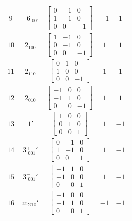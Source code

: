 \documentclass[fleqn,8pt]{jsarticle}
\begin{document}
\begin{longtable}{ccccc}
$ 9 $ & $ -6^{-}_{\,\,001} $ & $ \begin{bmatrix} 0 & -1 & 0 \\ 1 & -1 & 0 \\ 0 & 0 & -1 \end{bmatrix} $ & $ -1 $ & $ 1 $ \\ \hline
$ 10 $ & $ 2{}_{100} $ & $ \begin{bmatrix} 1 & -1 & 0 \\ 0 & -1 & 0 \\ 0 & 0 & -1 \end{bmatrix} $ & $ 1 $ & $ 1 $ \\ \hline
$ 11 $ & $ 2{}_{110} $ & $ \begin{bmatrix} 0 & 1 & 0 \\ 1 & 0 & 0 \\ 0 & 0 & -1 \end{bmatrix} $ & $ 1 $ & $ 1 $ \\ \hline
$ 12 $ & $ 2{}_{010} $ & $ \begin{bmatrix} -1 & 0 & 0 \\ -1 & 1 & 0 \\ 0 & 0 & -1 \end{bmatrix} $ & $ 1 $ & $ 1 $ \\ \hline
$ 13 $ & $ 1{}' $ & $ \begin{bmatrix} 1 & 0 & 0 \\ 0 & 1 & 0 \\ 0 & 0 & 1 \end{bmatrix} $ & $ 1 $ & $ -1 $ \\ \hline
$ 14 $ & $ 3^{+}_{\,\,001}{}' $ & $ \begin{bmatrix} 0 & -1 & 0 \\ 1 & -1 & 0 \\ 0 & 0 & 1 \end{bmatrix} $ & $ 1 $ & $ -1 $ \\ \hline
$ 15 $ & $ 3^{-}_{\,\,001}{}' $ & $ \begin{bmatrix} -1 & 1 & 0 \\ -1 & 0 & 0 \\ 0 & 0 & 1 \end{bmatrix} $ & $ 1 $ & $ -1 $ \\ \hline
$ 16 $ & $ {\rm m}_{210}{}' $ & $ \begin{bmatrix} -1 & 0 & 0 \\ -1 & 1 & 0 \\ 0 & 0 & 1 \end{bmatrix} $ & $ -1 $ & $ -1 $ \\ \hline

\end{longtable}
\end{document}
